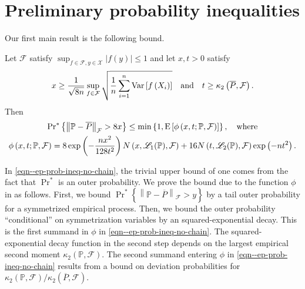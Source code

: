 
\section{Preliminary probability inequalities}
\label{sec--prob-ineq-prelim}

Our first main result is the following bound.

\begin{theorem}
\label{thm--ep-prob-ineq-no-chain}
Let \(\mathcal{F}\) satisfy \(\sup_{f \in \mathcal{F}, y \in \mathcal{X}} |f
(y)| \leq 1\) and let \(x, t > 0\) satisfy
\begin{equation*}
  x \geq \frac{1}{\sqrt{8 n}} \sup_{f \in \mathcal{F}} \sqrt{\frac{1}{n} \sum_{i
  = 1}^{n} \mathrm{Var} \left[ f \left( X_{i} \right) \right]} \quad \text{and} \quad
  t \geq \kappa_{2} \left( \overline{P}, \mathcal{F} \right).
\end{equation*}
Then
\begin{equation}
  \begin{gathered}
    \mathrm{Pr}^{\ast} \left\{ \left\| \mathbb{P} - \overline{P}
    \right\|_{\mathcal{F}} > 8 x \right\} \leq
    \min \left\{ 1, \mathrm{E} \left[ \phi \left( x, t; \mathbb{P}, \mathcal{F} \right)
    \right] \right\}, \quad \text{where}
    \\
    \phi \left( x, t; \mathbb{P}, \mathcal{F} \right) =
    8 \exp \left( - \frac{n x^{2}}{128 t^{2}} \right) N \left( x,
    \mathscr{L}_{1} (\mathbb{P}), \mathcal{F} \right) +
    16 N \left( t, \mathscr{L}_{2} (\mathbb{P}), \mathcal{F} \right) \exp \left(
    - n t^{2} \right).
  \end{gathered}
  \label{eqn--ep-prob-ineq-no-chain}
\end{equation}
\end{theorem}

In \eqref{eqn--ep-prob-ineq-no-chain}, the trivial upper bound of one comes from
the fact that \(\Pr^{\ast}\) is an outer probability.
We prove the bound due to the function \(\phi\) in
 as follows.
First, we bound \(\Pr^{\ast} \left\{ \left\| \mathbb{P} - \overline{P}
\right\|_{\mathcal{F}} > y \right\}\) by a tail outer probability for a
symmetrized empirical process.
Then, we bound the outer probability ``conditional'' on symmetrization variables
by an squared-exponential decay.
This is the first summand in \(\phi\) in \eqref{eqn--ep-prob-ineq-no-chain}.
The squared-exponential decay function in the second step depends on the largest
empirical second moment \(\kappa_{2} (\mathbb{P}, \mathcal{F})\).
The second summand entering \(\phi\) in \eqref{eqn--ep-prob-ineq-no-chain}
results from a bound on deviation probabilities for
\(\kappa_{2} (\mathbb{P}, \mathcal{F}) / \kappa_{2} (\overline{P},
\mathcal{F})\).

